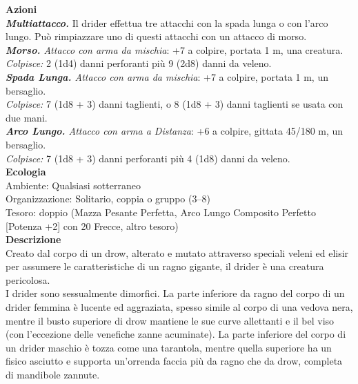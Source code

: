 \begin{multicols}{2}
\smallskip\textbf{Azioni}\\
\emph{\textbf{Multiattacco.}} Il drider effettua tre attacchi con la spada lunga o con l'arco lungo. Può rimpiazzare uno di questi attacchi con un attacco di morso.\\
\emph{\textbf{Morso.} Attacco con arma da mischia}: +7 a colpire, portata 1 m, una creatura.\\
\emph{Colpisce:} 2 (1d4) danni perforanti più 9 (2d8) danni da veleno.\\
\emph{\textbf{Spada Lunga.} Attacco con arma da mischia}: +7 a colpire, portata 1 m, un bersaglio.\\
\emph{Colpisce:} 7 (1d8 + 3) danni taglienti, o 8 (1d8 + 3) danni taglienti se usata con due mani.\\
\emph{\textbf{Arco Lungo.} Attacco con arma a Distanza}: +6 a colpire, gittata 45/180 m, un bersaglio.\\
\emph{Colpisce:} 7 (1d8 + 3) danni perforanti più 4 (1d8) danni da veleno.\\
\textbf{Ecologia}\\
Ambiente: Qualsiasi sotterraneo\\
Organizzazione: Solitario, coppia o gruppo (3–8)\\
Tesoro: doppio (Mazza Pesante Perfetta, Arco Lungo Composito Perfetto [Potenza +2] con 20 Frecce, altro tesoro)\\
\textbf{Descrizione}\\
Creato dal corpo di un drow, alterato e mutato attraverso speciali veleni ed elisir per assumere le caratteristiche di un ragno gigante, il drider è una creatura pericolosa.\\
I drider sono sessualmente dimorfici. La parte inferiore da ragno del corpo di un drider femmina è lucente ed aggraziata, spesso simile al corpo di una vedova nera, mentre il busto superiore di drow mantiene le sue curve allettanti e il bel viso (con l’eccezione delle venefiche zanne acuminate). La parte inferiore del corpo di un drider maschio è tozza come una tarantola, mentre quella superiore ha un fisico asciutto e supporta un’orrenda faccia più da ragno che da drow, completa di mandibole zannute.\\


\end{multicols}
